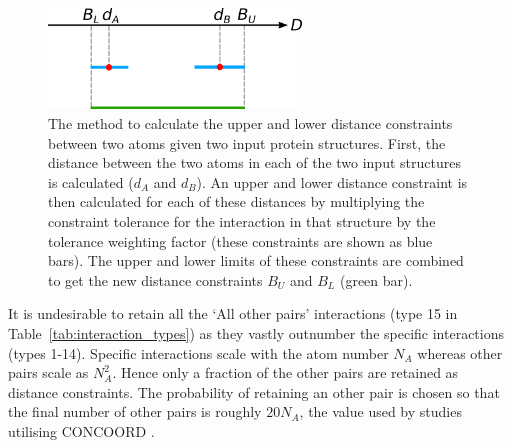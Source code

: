 \begin{figure}
\centering

\includegraphics[width=0.6\textwidth]{figures/distance_constraints/distance_constraints}

\caption[Calculation of the upper and lower distance constraints between two atoms given two input protein structures]
{The method to calculate the upper and lower distance constraints between two atoms given two input protein structures.
First, the distance between the two atoms in each of the two input structures is calculated ($d_{A}$ and $d_{B}$).
An upper and lower distance constraint is then calculated for each of these distances by multiplying the constraint tolerance for the interaction in that structure by the tolerance weighting factor (these constraints are shown as blue bars).
The upper and lower limits of these constraints are combined to get the new distance constraints $B_{U}$ and $B_{L}$ (green bar).}

\label{fig:distance_constraints}
\end{figure}


It is undesirable to retain all the `All other pairs' interactions (type 15 in Table~\ref{tab:interaction_types}) as they vastly outnumber the specific interactions (types 1-14).
Specific interactions scale with the atom number $N_{A}$ whereas other pairs scale as $N_{A}^{2}$.
Hence only a fraction of the other pairs are retained as distance constraints.
The probability of retaining an other pair is chosen so that the final number of other pairs is roughly $20N_{A}$, the value used by studies utilising CONCOORD \cite{DeGroot1999}.

